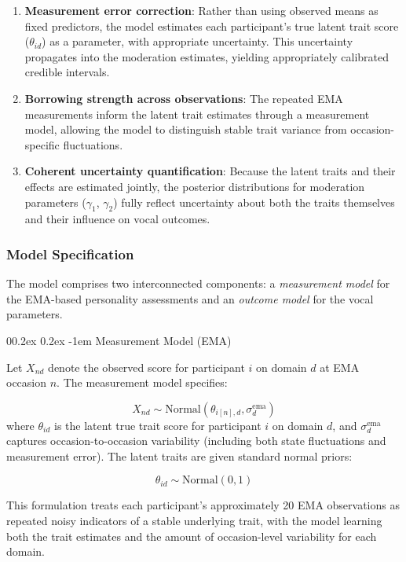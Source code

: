 \documentclass[
  english,
  man,floatsintext]{apa6}
\makeatletter
\let\oldparagraph\paragraph
\renewcommand{\paragraph}{
    \@ifstar
      \xxxParagraphStar
      \xxxParagraphNoStar
  }
\newcommand{\xxxParagraphStar}[1]{\oldparagraph*{#1}\mbox{}}
\newcommand{\xxxParagraphNoStar}[1]{\oldparagraph{#1}\mbox{}}
\renewcommand{\paragraph}{\@startsection{paragraph}{4}{\parindent}%
  {0\baselineskip \@plus 0.2ex \@minus 0.2ex}%
  {-1em}%
  {\normalfont\normalsize\bfseries\itshape\typesectitle}}
\makeatother
\begin{document}
\begin{enumerate}
\def\labelenumi{\arabic{enumi}.}
\item
  \textbf{Measurement error correction}: Rather than using observed means as fixed predictors, the model estimates each participant's true latent trait score (\(\theta_{id}\)) as a parameter, with appropriate uncertainty. This uncertainty propagates into the moderation estimates, yielding appropriately calibrated credible intervals.
\item
  \textbf{Borrowing strength across observations}: The repeated EMA measurements inform the latent trait estimates through a measurement model, allowing the model to distinguish stable trait variance from occasion-specific fluctuations.
\item
  \textbf{Coherent uncertainty quantification}: Because the latent traits and their effects are estimated jointly, the posterior distributions for moderation parameters (\(\gamma_1\), \(\gamma_2\)) fully reflect uncertainty about both the traits themselves and their influence on vocal outcomes.
\end{enumerate}

\subsubsection{Model Specification}\label{model-specification-1}

The model comprises two interconnected components: a \emph{measurement model} for the EMA-based personality assessments and an \emph{outcome model} for the vocal parameters.

\paragraph{Measurement Model (EMA)}\label{measurement-model-ema}

Let \(X_{nd}\) denote the observed score for participant \(i\) on domain \(d\) at EMA occasion \(n\). The measurement model specifies:

\[
X_{nd} \sim \text{Normal}(\theta_{i[n],d}, \sigma_d^{\text{ema}})
\]
where \(\theta_{id}\) is the latent true trait score for participant \(i\) on domain \(d\), and \(\sigma_d^{\text{ema}}\) captures occasion-to-occasion variability (including both state fluctuations and measurement error). The latent traits are given standard normal priors:

\[
\theta_{id} \sim \text{Normal}(0, 1)
\]

This formulation treats each participant's approximately 20 EMA observations as repeated noisy indicators of a stable underlying trait, with the model learning both the trait estimates and the amount of occasion-level variability for each domain.
\end{document}
